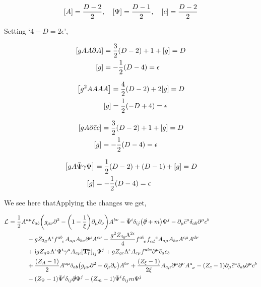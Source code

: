 \begin{align}
    \qty[A]=\frac{D-2}{2},\ \ \ \qty[\Psi]=\frac{D-1}{2},\ \ \ \qty[c]=\frac{D-2}{2}\nonumber
\end{align}

Setting `$4-D=2\epsilon$',

\begin{align}
    \qty[gAA\partial A]&=\frac32\qty(D-2)+1+\qty[g]=D\nonumber\\
    \qty[g]&=-\frac12 \qty(D-4)=\epsilon
\end{align}

\begin{align}
    \qty[g^2AAAA]&=\frac42\qty(D-2)+2\qty[g]=D\nonumber\\
    \qty[g]&=\frac12\qty(-D+4)=\epsilon
\end{align}

\begin{align}
    \qty[gA\partial\bar cc]&=\frac32\qty(D-2)+1+\qty[g]=D\nonumber\\
    \qty[g]&=-\frac12\qty(D-4)=\epsilon
\end{align}

\begin{align}
    \qty[gA\bar\Psi\gamma\Psi]&=\frac12\qty(D-2)+\qty(D-1)+\qty[g]=D\nonumber\\
    \qty[g]&=-\frac12\qty(D-4)=\epsilon
\end{align}

We see here thatApplying the changes we get,

\begin{align}
    \mathcal L&=\frac{1}{2}A^{a\mu}\delta_{ab}\qty(g_{\mu\nu}\partial^2 -\qty(1-\frac1\xi)\partial_\mu\partial_\nu )A^{b\nu}-\bar{\Psi}^i\delta_{ij}\qty(\slashed\partial+m)\Psi^j-\partial_\mu\bar c^a\delta_{ab}\partial^\mu c^b\nonumber\\
    &\quad\quad\quad-gZ_{3g}\Lambda^\epsilon\tensor{f}{^a^b_c}A_{a\mu}A_{b\nu}\partial^\mu A^{c\nu}-\frac{g^2Z_{4g}\Lambda^{2\epsilon}}{4}\tensor{f}{^a^b_e}\tensor{f}{_c_d^e}A_{a\mu}A_{b\nu}A^{c\mu}A^{d\nu}\nonumber\\
    &\quad\quad\quad+\im gZ_{g\Psi}\Lambda^\epsilon\bar{\Psi}^i\gamma^\mu A_{a\mu}\tensor{\qty[\vb T^a_{\textnormal f}]}{_i_j}\Psi^j+gZ_{gc}\Lambda^\epsilon A_{c\mu}\tensor{f}{^a^b^c}\partial^\mu \bar c_ac_b\nonumber\\
    &\quad\quad\quad +\frac{\qty(Z_A-1)}{2}A^{a\mu}\delta_{ab}\qty(g_{\mu\nu}\partial^2 -\partial_\mu\partial_\nu )A^{b\nu}+\frac{\qty(Z_\xi-1)}{2\xi} A_{a\mu}\partial^\mu\partial^\nu \tensor{A}{^a_\nu}-\qty(Z_c-1)\partial_\mu\bar c^a\delta_{ab}\partial^\mu c^b\label{lagrangian1}\nonumber\\
    &\quad\quad\quad-\qty(Z_\Psi-1)\bar{\Psi}^i\delta_{ij}\slashed\partial\Psi^j-\qty(Z_m-1)\bar{\Psi}^i\delta_{ij}m\Psi^j
\end{align}

